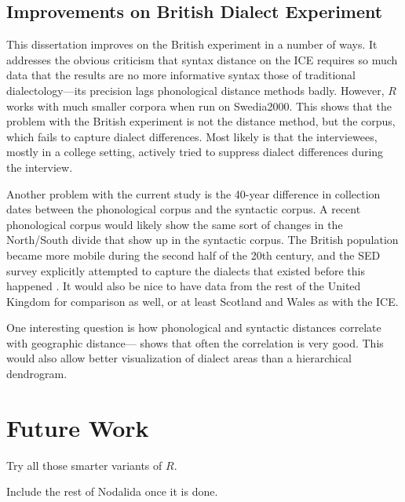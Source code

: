 \subsection{Improvements on British Dialect Experiment}

This dissertation improves on the British experiment in a number of
ways. It addresses the obvious criticism that syntax distance on the
ICE requires so much data that the results are no more informative
syntax those of traditional dialectology---its precision lags
phonological distance methods badly. However, $R$ works with much
smaller corpora when run on Swedia2000. This shows that the problem
with the British experiment is not the distance method, but the
corpus, which fails to capture dialect differences. Most likely is
that the interviewees, mostly in a college setting, actively tried to
suppress dialect differences during the interview.

Another problem with the current study is the 40-year difference in
collection dates between the phonological corpus and the syntactic
corpus. A recent phonological corpus would likely show the same sort
of changes in the North/South divide that show up in the syntactic
corpus. The British population became more mobile during the second
half of the 20th century, and the SED survey explicitly attempted to capture
the dialects that existed before this happened \cite{orton78}.
It would also be nice to have data from the rest of the United Kingdom for
comparison as well, or at least Scotland and Wales as with the ICE.



One interesting question is
how phonological and syntactic distances correlate with geographic
distance--- shows that often the correlation is
very good. This would also allow better visualization of dialect areas
than a hierarchical dendrogram.

\section{Future Work}

Try all those smarter variants of $R$.

Include the rest of Nodalida once it is done.

